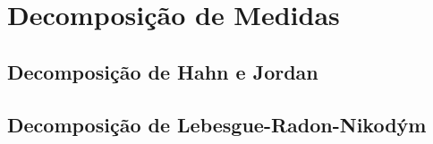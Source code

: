 \chapter{Decomposição de Medidas}

\section{Decomposição de Hahn e Jordan}
\jordan

\section{Decomposição de Lebesgue-Radon-Nikodým}
\eitherSingular
\asZero
\lebesgueRadonNikodym